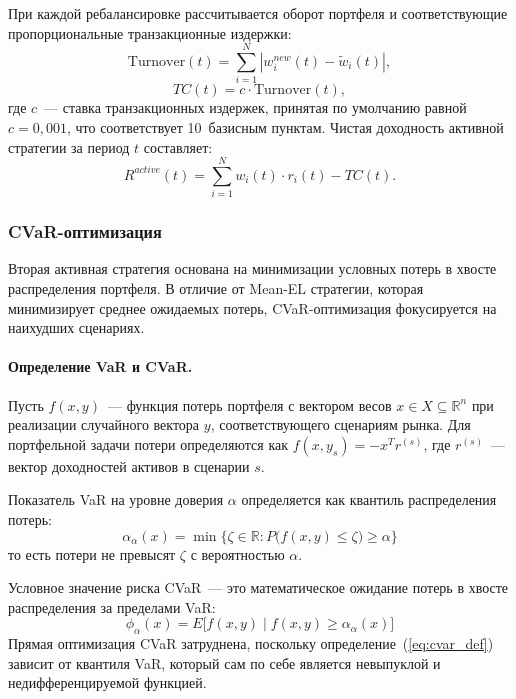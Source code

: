 \documentclass[]{article}
\begin{document}
	При каждой ребалансировке рассчитывается оборот портфеля и соответствующие пропорциональные
	транзакционные издержки:
	\begin{equation}
		\label{eq:turnover}
		\mathrm{Turnover}(t) = \sum_{i=1}^N \left| w_i^{new}(t) - \tilde{w}_i(t) \right|,
	\end{equation}
	\begin{equation}
		\label{eq:tc}
		TC(t) = c \cdot \mathrm{Turnover}(t),
	\end{equation}
	где $c$~--- ставка транзакционных издержек, принятая по умолчанию равной $c = 0{,}001$, что
	соответствует 10~базисным пунктам. Чистая доходность активной стратегии за период $t$ составляет:
	\begin{equation}
		R^{active}(t) = \sum_{i=1}^N w_i(t) \cdot r_i(t) - TC(t).
	\end{equation}

	\subsubsection{CVaR-оптимизация}

	Вторая активная стратегия основана на минимизации условных потерь в хвосте распределения портфеля.
	В отличие от Mean-EL стратегии, которая минимизирует среднее ожидаемых потерь, CVaR-оптимизация
	фокусируется на наихудших сценариях.

	\paragraph{Определение VaR и CVaR.}
	Пусть $f(x, y)$~--- функция потерь портфеля с вектором весов $x \in X \subseteq \mathbb{R}^n$
	при реализации случайного вектора $y$, соответствующего сценариям рынка. Для портфельной задачи
	потери определяются как $f(x, y_s) = -x^T r^{(s)}$, где $r^{(s)}$~--- вектор доходностей активов
	в сценарии $s$.

	Показатель VaR на уровне доверия $\alpha$ определяется как квантиль распределения потерь:
	\begin{equation}
		\label{eq:var_def}
		\alpha_\alpha(x) = \min\bigl\{\zeta \in \mathbb{R} : P\bigl(f(x, y) \leq \zeta\bigr) \geq \alpha\bigr\}
	\end{equation}
	то есть потери не превысят $\zeta$ с вероятностью $\alpha$.

	Условное значение риска CVaR~--- это математическое ожидание потерь в хвосте распределения за
	пределами VaR:
	\begin{equation}
		\label{eq:cvar_def}
		\phi_\alpha(x) = E\bigl[f(x, y) \mid f(x, y) \geq \alpha_\alpha(x)\bigr]
	\end{equation}
	Прямая оптимизация CVaR затруднена, поскольку определение~(\ref{eq:cvar_def}) зависит от
	квантиля VaR, который сам по себе является невыпуклой и недифференцируемой функцией.
\end{document}
